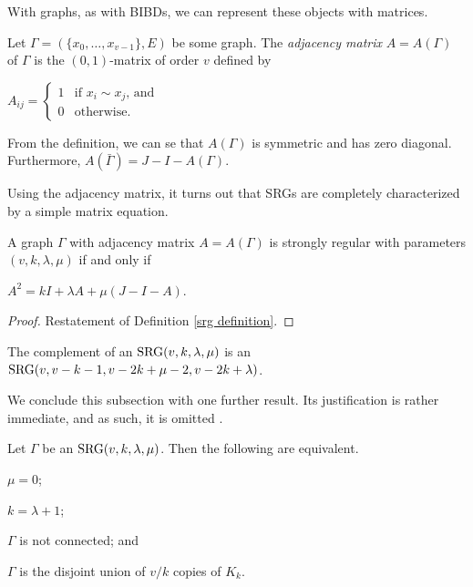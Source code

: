 \documentclass[../../../main]{subfiles}
\begin{document}
With graphs, as with BIBDs, we can represent these objects with matrices.

\begin{defin}\label{adj matrix}
 Let $\Gamma = (\{x_0, \dots, x_{v-1}\},E)$ be some graph. The {\it adjacency matrix} $A=A(\Gamma)$ of $\Gamma$ is the $(0,1)$-matrix of order $v$ defined by 
 \begin{defenum}
 \item $A_{ij} = \begin{cases}
           1 & \text{if } x_i \sim x_j \text{, and} \\
           0 & \text{otherwise.}
          \end{cases}$
 \end{defenum}
\end{defin}
 
 From the definition, we can se that $A(\Gamma)$ is symmetric and has zero diagonal. Furthermore, $A(\bar\Gamma) = J - I - A(\Gamma)$.
 
 Using the adjacency matrix, it turns out that SRGs are completely characterized by a simple matrix equation.
 
 \begin{prop}\label{srg adj prop}
  A graph $\Gamma $ with adjacency matrix $A=A(\Gamma)$ is strongly regular with parameters $(v,k,\lambda,\mu)$ if and only if
  \begin{defenum}
  \item\label{srg-eq} $A^2 = kI + \lambda A + \mu (J - I - A)$.
  \end{defenum}
 \end{prop}
 
 \begin{proof}
  Restatement of Definition \ref{srg definition}.
 \end{proof}
 
 \begin{cor}
  The complement of an $\text{SRG}(v,k,\lambda,\mu)$ is an $\text{SRG}(v,v-k-1,v-2k+\mu-2,v-2k+\lambda)$.
 \end{cor}
 
 We conclude this subsection with one further result. Its justification is rather immediate, and as such, it is omitted \cite[see][Proposition 7.1.6]{combinatorics-of-symmetric-designs}.
 
 \begin{prop}
  Let $\Gamma$ be an $\text{SRG}(v,k,\lambda,\mu)$. Then the following are equivalent.
  \begin{defenum}
   \item $\mu=0$;
   \item $k=\lambda+1$;
   \item $\Gamma$ is not connected; and
   \item $\Gamma$ is the disjoint union of $v/k$ copies of $K_k$.
  \end{defenum}
 \end{prop}
 
\end{document}
